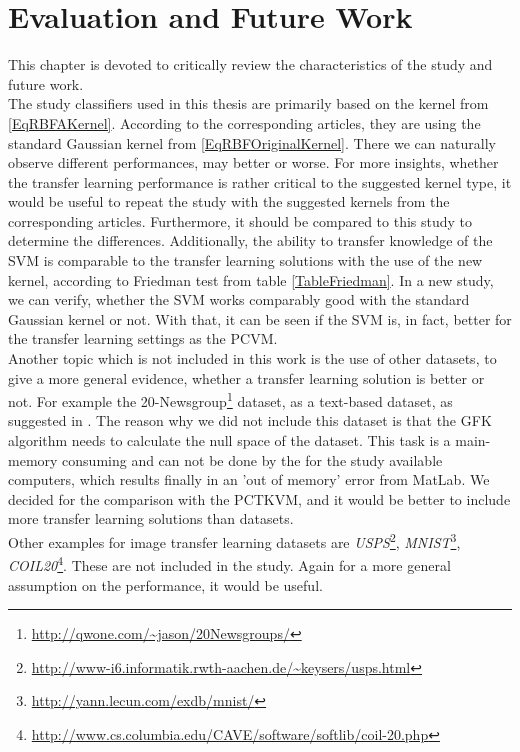 \chapter{Evaluation and Future Work}\label{EvalF}	
This chapter is devoted to critically review the characteristics of the study and future work.\\
The study classifiers used in this thesis are primarily based on the kernel from \eqref{EqRBFAKernel}.
According to the corresponding articles, they are using the standard Gaussian kernel from \eqref{EqRBFOriginalKernel}.\cite{Long.}\cite{Gong.}\cite{Pan.2011}
There we can naturally observe different performances, may better or worse.
For more insights, whether the transfer learning performance is rather critical to the suggested kernel type, it would be useful to repeat the study with the suggested kernels from the corresponding articles.
Furthermore, it should be compared to this study to determine the differences.
Additionally, the ability to transfer knowledge of the \acs{SVM} is comparable to the transfer learning solutions with the use of the new kernel, according to Friedman test from table \ref{TableFriedman}.
In a new study, we can verify, whether the \acs{SVM} works comparably good with the standard Gaussian kernel or not.
With that, it can be seen if the \acs{SVM} is, in fact, better for the transfer learning settings as the \acs{PCVM}.\\
Another topic which is not included in this work is the use of other datasets, to give a more general evidence, whether a transfer learning solution is better or not.
For example the 20-Newsgroup\footnote{\url{http://qwone.com/~jason/20Newsgroups/}} dataset, as a text-based dataset, as suggested in \cite{Pan.2010}.
The reason why we did not include this dataset is that the \acs{GFK} algorithm needs to calculate the null space of the dataset.
This task is a main-memory consuming and can not be done by the for the study available computers, which results finally in an 'out of memory' error from MatLab.
We decided for the comparison with the \acs{PCTKVM}, and it would be better to include more transfer learning solutions than datasets.\\
Other examples for image transfer learning datasets are \textit{USPS}\footnote{\url{http://www-i6.informatik.rwth-aachen.de/~keysers/usps.html}}, \textit{MNIST}\footnote{\url{http://yann.lecun.com/exdb/mnist/}}, \textit{COIL20}\footnote{\url{http://www.cs.columbia.edu/CAVE/software/softlib/coil-20.php}}.\cite{Long.}\cite{Long.2014}
These are not included in the study. Again for a more general assumption on the performance, it would be useful.

